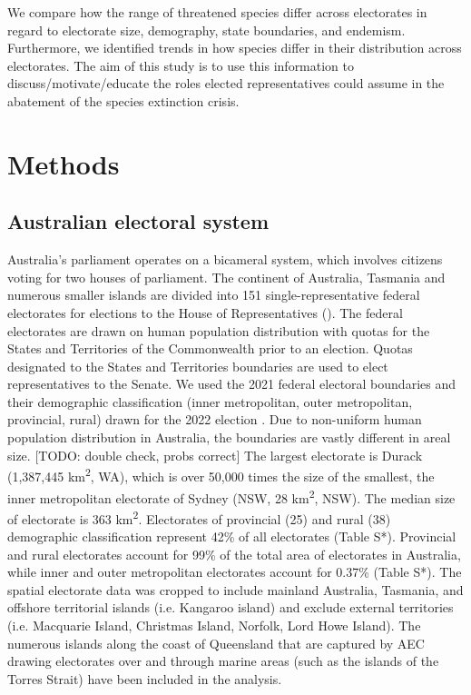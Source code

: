 \documentclass[a4paper,11pt]{article}
\begin{document}
We compare how the range of threatened species differ across electorates in regard to electorate size, demography, state boundaries, and endemism. Furthermore, we identified trends in how species differ in their distribution across electorates. The aim of this study is to use this information to discuss/motivate/educate the roles elected representatives could assume in the abatement of the species extinction crisis.

\section{Methods}

\subsection{Australian electoral system}

Australia's parliament operates on a bicameral system, which involves citizens voting for two houses of parliament. The continent of Australia, Tasmania and numerous smaller islands are divided into 151 single-representative federal electorates for elections to the House of Representatives (\cite{parliamentofaustraliaElectoralDivisions2018}). The federal electorates are drawn on human population distribution with quotas for the States and Territories of the Commonwealth prior to an election. Quotas designated to the States and Territories boundaries are used to elect representatives to the Senate. We used the 2021 federal electoral boundaries and their demographic classification (inner metropolitan, outer metropolitan, provincial, rural) drawn for the 2022 election \cite{australiaelectoralcomissionFederalElectoralBoundaries2019}. Due to non-uniform human population distribution in Australia, the boundaries are vastly different in areal size. [TODO: double check, probs correct] The largest electorate is Durack (1,387,445 km\textsuperscript{2}, WA), which is over 50,000 times the size of the smallest, the inner metropolitan electorate of Sydney (NSW, 28 km\textsuperscript{2}, NSW). The median size of electorate is 363 km\textsuperscript{2}. Electorates of provincial (25) and rural (38) demographic classification represent 42\% of all electorates (Table S*). Provincial and rural electorates account for 99\% of the total area of electorates in Australia, while inner and outer metropolitan electorates account for 0.37\% (Table S*). The spatial electorate data was cropped to include mainland Australia, Tasmania, and offshore territorial islands (i.e. Kangaroo island) and exclude external territories (i.e. Macquarie Island, Christmas Island, Norfolk, Lord Howe Island). The numerous islands along the coast of Queensland that are captured by AEC drawing electorates over and through marine areas (such as the islands of the Torres Strait) have been included in the analysis.
\end{document}
